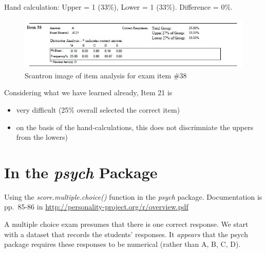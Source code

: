 \documentclass[
  english,
]{book}
\providecommand{\tightlist}{%
  \setlength{\itemsep}{0pt}\setlength{\parskip}{0pt}}
\begin{document}
Hand calculation: Upper = 1 (33\%), Lower = 1 (33\%). Difference = 0\%.

\begin{figure}
\centering
\includegraphics{images/ItemAnalExam/Item38.jpg}
\caption{Scantron image of item analysis for exam item \#38}
\end{figure}

Considering what we have learned already, Item 21 is

\begin{itemize}
\tightlist
\item
  very difficult (25\% overall selected the correct item)
\item
  on the basis of the hand-calculations, this does not discrimniate the uppers from the lowers)
\end{itemize}

\hypertarget{in-the-psych-package}{%
\section{\texorpdfstring{In the \emph{psych} Package}{In the psych Package}}\label{in-the-psych-package}}

Using the \emph{score.multiple.choice()} function in the \emph{psych} package. Documentation is pp.~85-86 in \url{http://personality-project.org/r/overview.pdf}

A multiple choice exam presumes that there is one correct response. We start with a dataset that records the students' responses. It \emph{appears} that the psych package requires these responses to be numerical (rather than A, B, C, D).
\end{document}
